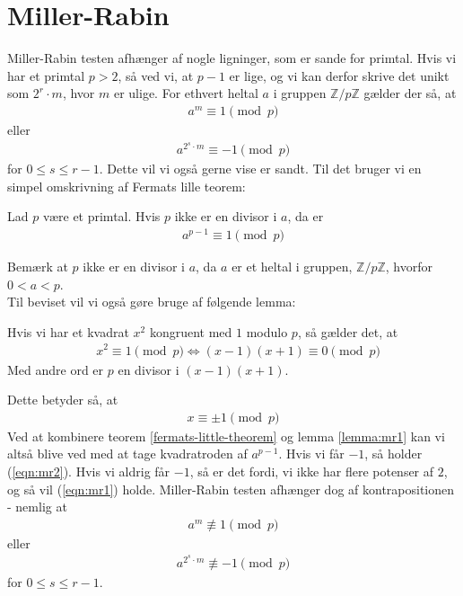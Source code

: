 \section{Miller-Rabin}
Miller-Rabin testen afhænger af nogle ligninger, som er sande for primtal. Hvis vi har et primtal $p>2$, så ved vi, at $p-1$ er lige, og vi kan derfor skrive det unikt som $2^r \cdot m$, hvor $m$ er ulige. For ethvert heltal $a$ i gruppen $\mathbb{Z}/p\mathbb{Z}$ gælder der så, at
\begin{align}
  a^m \equiv 1 \pmod{p}
  \label{eqn:mr1}
\end{align}
eller
\begin{align}
  a^{2^s \cdot m} \equiv -1 \pmod{p}
  \label{eqn:mr2}
\end{align}
for $0 \leq s \leq r-1$. Dette vil vi også gerne vise er sandt. Til det bruger vi en simpel omskrivning af
Fermats lille teorem:
\begin{theorem}
Lad $p$ være et primtal. Hvis $p$ ikke er en divisor i $a$, da er
\begin{align*}
  a^{p-1} \equiv 1 \pmod{p}
\end{align*}
\label{fermats-little-theorem}
\end{theorem}
Bemærk at $p$ ikke er en divisor i $a$, da $a$ er et heltal i gruppen, $\mathbb{Z}/p\mathbb{Z}$, hvorfor $0 < a < p$.\\
Til beviset vil vi også gøre bruge af følgende lemma:
\begin{lemma}
Hvis vi har et kvadrat $x^2$ kongruent med $1$ modulo $p$, så gælder det, at
\begin{align*}
  &x^2 \equiv 1 \pmod{p} \iff (x-1)(x+1) \equiv 0 \pmod{p}
\end{align*}
Med andre ord er $p$ en divisor i $(x-1)(x+1)$.
\label{lemma:mr1}
\end{lemma}
Dette betyder så, at
\begin{align*}
  x \equiv \pm 1 \pmod{p}
\end{align*}
Ved at kombinere teorem \ref{fermats-little-theorem} og lemma \ref{lemma:mr1} kan vi altså blive ved med at tage kvadratroden af $a^{p-1}$.
Hvis vi får $-1$, så holder (\ref{eqn:mr2}). Hvis vi aldrig får $-1$, så er det fordi, vi ikke har flere potenser af $2$, og så vil (\ref{eqn:mr1}) holde.
Miller-Rabin testen afhænger dog af kontrapositionen - nemlig at
\begin{align*}
  a^m \not \equiv 1 \pmod{p}
\end{align*}
eller
\begin{align*}
  a^{2^s \cdot m} \not \equiv -1 \pmod{p}
\end{align*}
for $0\leq s\leq r-1$. 

